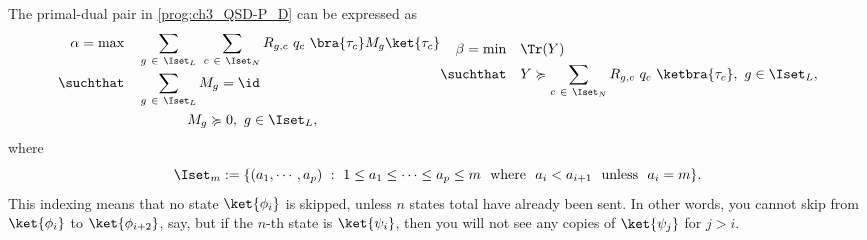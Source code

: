 \begin{appendices}
The primal-dual pair in \eqref{prog:ch3_QSD-P_D} can be expressed as 
\begin{equation}
\label{prog:ch3_QSD-D_mQCP}
        \begin{aligned}
            \alpha = \max \quad & \sum_{g\ \in\ \Iset_L}\ \sum_{c\ \in\ \Iset_N} R_{g, c}\ q_c\ \bra{\tau_c} M_g \ket{\tau_c} \\
            \suchthat \quad & \sum_{g\ \in\ \Iset_L} M_g = \id \\
            & \hspace{35pt} M_g \succcurlyeq 0,\ g \in \Iset_L, 
        \end{aligned}
        \begin{aligned}
            \beta = \min \quad & \Tr(Y) \\
            \suchthat \quad & Y \succcurlyeq \sum_{c\ \in\ \Iset_N} R_{g, c}\ q_c\ \ketbra{\tau_c},\ g \in \Iset_L, \\
            & \phantom{N}
        \end{aligned}
\end{equation} 
where
\begin{equation} 
\Iset_m := \{(a_1, \cdots, a_p)\ :\ 1 \le a_1 \le \cdots \le a_p \le m\ \text{ where }\ a_i < a_{i+1}\ \text{ unless }\ a_i = m\}.
\end{equation} 
This indexing means that no state $\ket{\phi_i}$ is skipped, unless $n$ states total have already been sent. 
In other words, you cannot skip from $\ket{\phi_i}$ to $\ket{\phi_{i+2}}$, say, but if the $n$-th state is $\ket{\psi_i}$, then you will not see any copies of $\ket{\psi_j}$ for $j > i$.


\end{appendices}
